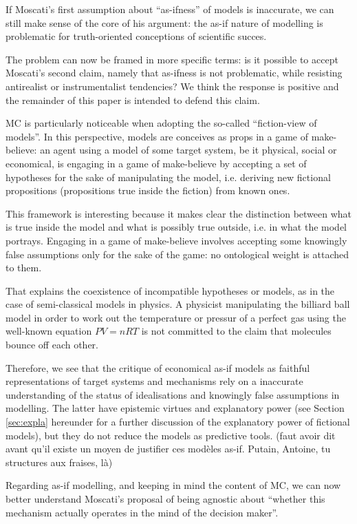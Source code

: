 \documentclass[a4paper,11pt]{article}
\theoremstyle{definition}
\begin{document}
If Moscati's first assumption about ``as-ifness'' of models is inaccurate, we can still make sense of the core of his argument: the as-if nature of modelling is problematic for truth-oriented conceptions of scientific succes.

The problem can now be framed in more specific terms: is it possible to accept Moscati's second claim, namely that as-ifness is not problematic, while resisting antirealist or instrumentalist tendencies? We think the response is positive and the remainder of this paper is intended to defend this claim.

MC is particularly noticeable when adopting the so-called ``fiction-view of models''. In this perspective, models are conceives as props in a game of make-believe: an agent using a model of some target system, be it physical, social or economical, is engaging in a game of make-believe by accepting a set of hypotheses for the sake of manipulating the model, i.e. deriving new fictional propositions (propositions true inside the fiction) from known ones.

This framework is interesting because it makes clear the distinction between what is true inside the model and what is possibly true outside, i.e. in what the model portrays. Engaging in a game of make-believe involves accepting some knowingly false assumptions only for the sake of the game: no ontological weight is attached to them.

That explains the coexistence of incompatible hypotheses or models, as in the case of semi-classical models in physics. A physicist manipulating the billiard ball model in order to work out the temperature or pressur of a perfect gas using the well-known equation $PV=nRT$ is not committed to the claim that molecules bounce off each other.

Therefore, we see that the critique of economical as-if models as faithful representations of target systems and mechanisms rely on a inaccurate understanding of the status of idealisations and knowingly false assumptions in modelling. The latter have epistemic virtues and explanatory power (see Section \ref{sec:expla} hereunder for a further discussion of the explanatory power of fictional models), but they do not reduce the models as predictive tools. (faut avoir dit avant qu'il existe un moyen de justifier ces modèles as-if. Putain, Antoine, tu structures aux fraises, là)

Regarding as-if modelling, and keeping in mind the content of MC, we can now better understand Moscati's proposal of being agnostic about ``whether this mechanism actually operates in the mind of the decision maker''. \citep[p.~2]{Moscati2023}
\end{document}
